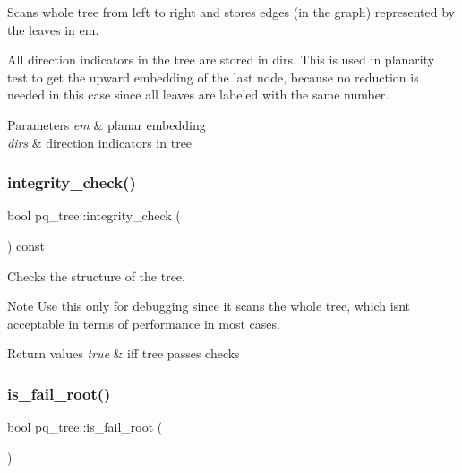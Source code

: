 Scans whole tree from left to right and stores edges (in the graph) represented by the leaves in {\ttfamily em}. 

All direction indicators in the tree are stored in {\ttfamily dirs}. This is used in planarity test to get the upward embedding of the last node, because no reduction is needed in this case since all leaves are labeled with the same number.


\begin{DoxyParams}{Parameters}
{\em em} & planar embedding \\
\hline
{\em dirs} & direction indicators in tree \\
\hline
\end{DoxyParams}
\mbox{\label{classpq__tree_a170813af06d7b02083c3a7785e080de5}} 
\subsubsection{\texorpdfstring{integrity\+\_\+check()}{integrity\_check()}}
{\footnotesize\ttfamily bool pq\+\_\+tree\+::integrity\+\_\+check (\begin{DoxyParamCaption}{ }\end{DoxyParamCaption}) const}



Checks the structure of the tree. 

\begin{DoxyNote}{Note}
Use this only for debugging since it scans the whole tree, which isn\textquotesingle{}t acceptable in terms of performance in most cases.
\end{DoxyNote}

\begin{DoxyRetVals}{Return values}
{\em true} & iff tree passes checks \\
\hline
\end{DoxyRetVals}
\mbox{\label{classpq__tree_ab320f9d84cba3198a95cc5f33fde0813}} 
\subsubsection{\texorpdfstring{is\+\_\+fail\+\_\+root()}{is\_fail\_root()}}
{\footnotesize\ttfamily bool pq\+\_\+tree\+::is\+\_\+fail\+\_\+root (\begin{DoxyParamCaption}{ }\end{DoxyParamCaption})\hspace{0.3cm}{\ttfamily [inline]}}



